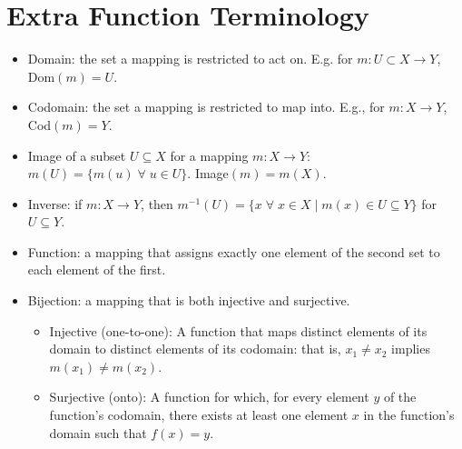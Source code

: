 \section{Extra Function Terminology}
\begin{itemize}
    \item Domain: the set a mapping is restricted to act on. E.g. for $m: U\subset X\rightarrow Y$, Dom$(m)=U$.
    \item Codomain: the set a mapping is restricted to map into. E.g., for $m: X\rightarrow Y$, Cod$(m)=Y$.
    \item Image of a subset $U\subseteq X$ for a mapping $m: X\rightarrow Y$: $m(U) = \{m(u) \;\forall \;u \in U\}$. Image$(m)=m(X)$.
    \item Inverse: if $m: X\rightarrow Y$, then $m^{-1}(U) = \{x \;\forall \;x\in X\;|\; m(x)\in U\subseteq Y \}$ for $U\subseteq Y$.
    \item Function: a mapping that assigns exactly one element of the second set to each element of the first.
    \item Bijection: a mapping that is both injective and surjective.
    \begin{itemize}
        \item Injective (one-to-one): A function that maps distinct elements of its domain to distinct elements of its codomain: that is, $x_1\ne x_2$ implies $m(x_1)\ne m(x_2)$.
        \item Surjective (onto): A function for which, for every element $y$ of the function's codomain, there exists at least one element $x$ in the function's domain such that $f(x)=y$.
    \end{itemize}
\end{itemize}

